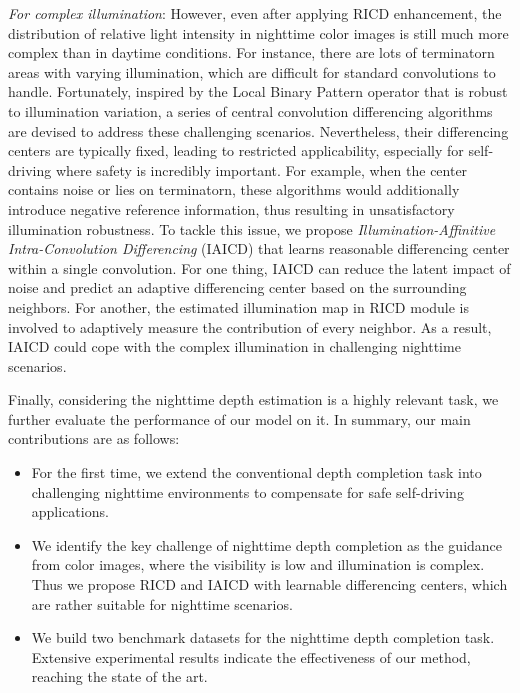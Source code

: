 \documentclass{article}
\begin{document}
\emph{For complex illumination}: However, even after applying RICD enhancement, the distribution of relative light intensity in nighttime color images is still much more complex than in daytime conditions. For instance, there are lots of terminatorn areas with varying illumination, which are difficult for standard convolutions to handle. Fortunately, inspired by the Local Binary Pattern operator \cite{ojala1994performance,boulkenafet2015face} that is robust to illumination variation, a series of central convolution differencing algorithms \cite{yu2020searching,yu2020fas,su2021pixel,tan2022semantic} are devised to address these challenging scenarios. Nevertheless, their differencing centers are typically fixed, leading to restricted applicability, especially for self-driving where safety is incredibly important. For example, when the center contains noise or lies on terminatorn, these algorithms would additionally introduce negative reference information, thus resulting in unsatisfactory illumination robustness. To tackle this issue, we propose \emph{Illumination-Affinitive Intra-Convolution Differencing} (IAICD) that learns reasonable differencing center within a single convolution. For one thing, IAICD can reduce the latent impact of noise and predict an adaptive differencing center based on the surrounding neighbors. For another, the estimated illumination map in RICD module is involved to adaptively measure the contribution of every neighbor. As a result, IAICD could cope with the complex illumination in challenging nighttime scenarios. 

Finally, considering the nighttime depth estimation \cite{wang2021regularizing,liu2021self,zheng2023steps} is a highly relevant task, we further evaluate the performance of our model on it. In summary, our main contributions are as follows: 
\begin{itemize}
    \item For the first time, we extend the conventional depth completion task into challenging nighttime environments to compensate for safe self-driving applications. 
    \item We identify the key challenge of nighttime depth completion as the guidance from color images, where the visibility is low and illumination is complex. Thus we propose RICD and IAICD with learnable differencing centers, which are rather suitable for nighttime scenarios. 
    \item We build two benchmark datasets for the nighttime depth completion task. Extensive experimental results indicate the effectiveness of our method, reaching the state of the art. 
\end{itemize}
\end{document}
